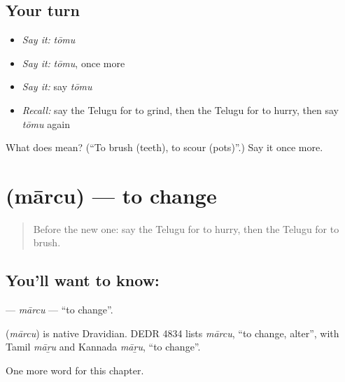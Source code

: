 \subsection*{Your turn}
\begin{itemize}
\raggedright
  \item \emph{Say it:} \emph{tōmu}
  \item \emph{Say it:} \emph{tōmu}, once more
  \item \emph{Say it:} say \emph{tōmu}
  \item \emph{Recall:} say the Telugu for to grind, then the Telugu for to hurry, then say \emph{tōmu} again
\end{itemize}

\begin{tcolorbox}[breakable,colback=teal!4,colframe=teal!35!black,title={Before you move on}]
What does  mean? (\textquotedblleft{}To brush (teeth), to scour (pots)\textquotedblright{}.) Say it once more.
\end{tcolorbox}
\section[\texorpdfstring{\te{మార్చు} (mārcu)}{మార్చు (mārcu)}]{ (mārcu) — to change}

\label{lesson:TE-C158-marcu}



\begin{quote}
Before the new one: say the Telugu for to hurry, then the Telugu for to brush.
\end{quote}

\subsection*{You'll want to know: }
\textbf{} — \emph{mārcu} — \textquotedblleft{}to change\textquotedblright{}.

\begin{cousinweb}
\textbf{} (\emph{mārcu}) is native Dravidian. DEDR 4834 lists \emph{mārcu}, \textquotedblleft{}to change, alter\textquotedblright{}, with Tamil \emph{māṟu} and Kannada \emph{māṟu}, \textquotedblleft{}to change\textquotedblright{}.
\end{cousinweb}

\begin{grammarlens}[title={What you've built}]
One more word for this chapter.
\end{grammarlens}

